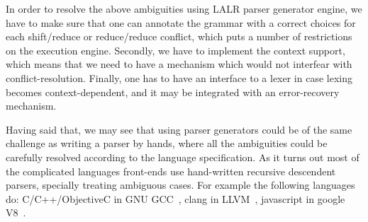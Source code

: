 In order to resolve the above ambiguities using LALR parser generator
engine, we have to make sure that one can annotate the grammar with a correct
choices for each shift/reduce or reduce/reduce conflict, which puts
a number of restrictions on the execution engine.  Secondly, we have
to implement the context support, which means that we need to have a
mechanism which would not interfear with conflict-resolution.
Finally, one has to have an interface to a lexer in case lexing becomes
context-dependent, and it may be integrated with an error-recovery
mechanism.

Having said that, we may see that using parser generators could be of
the same challenge as writing a parser by hands, where all the
ambiguities could be carefully resolved according to the language
specification.  As it turns out most of the complicated languages
front-ends use hand-written recursive descendent parsers, specially
treating ambiguous cases.  For example the following languages do:
C/C++/ObjectiveC in GNU GCC~\cite{gcc}, clang in LLVM~\cite{}, 
javascript in google V8~\cite{}.

